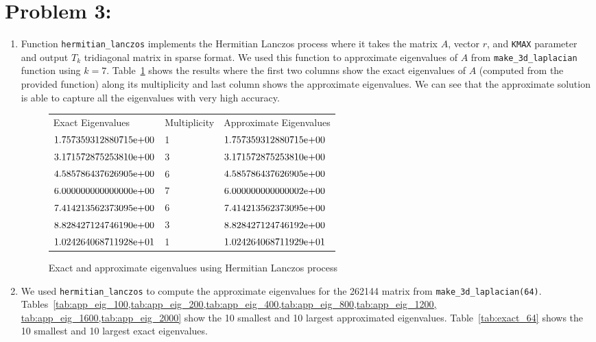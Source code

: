 \newpage
\section*{Problem 3:}
\begin{enumerate}
\item Function \texttt{hermitian\_lanczos} implements the Hermitian Lanczos process where it takes the matrix $A$, vector $r$, and \texttt{KMAX} parameter and output $T_{k}$ tridiagonal matrix in sparse format. We used this function to approximate eigenvalues of $A$ from \texttt{make\_3d\_laplacian} function using $k=7$. Table~\ref{tab:app_eig_7} shows the results where the first two columns show the exact eigenvalues of $A$ (computed from the provided function) along its multiplicity and last column shows the approximate eigenvalues. We can see that the approximate solution is able to capture all the eigenvalues with very high accuracy.

\begin{figure}[tbh]
 \centering    
\begin{tabular}{ |p{5cm}| p{2cm}|| p{5cm}|}
\hline
 Exact Eigenvalues  & Multiplicity & Approximate Eigenvalues \\ \hhline{|=|=|=|}   
${1.757359312880715}\mathrm{e}{+00}$ & 1& ${1.757359312880715}\mathrm{e}{+00}$ \\
${3.171572875253810}\mathrm{e}{+00}$ &3 & ${3.171572875253810}\mathrm{e}{+00}$ \\
${4.585786437626905}\mathrm{e}{+00}$ &6 & ${4.585786437626905}\mathrm{e}{+00}$ \\
${6.000000000000000}\mathrm{e}{+00}$ & 7& ${6.000000000000002}\mathrm{e}{+00}$ \\
${7.414213562373095}\mathrm{e}{+00}$&6 & ${7.414213562373095}\mathrm{e}{+00}$ \\
${8.828427124746190}\mathrm{e}{+00}$ &3 & ${8.828427124746192}\mathrm{e}{+00}$ \\
${1.024264068711928}\mathrm{e}{+01}$ &1 & ${1.024264068711929}\mathrm{e}{+01}$ \\
\hline
\end{tabular} 
\caption{Exact and approximate eigenvalues using Hermitian Lanczos process}
   \label{tab:app_eig_7}
\end{figure}

\item We used \texttt{hermitian\_lanczos} to compute the approximate eigenvalues for the 262144  matrix from \texttt{make\_3d\_laplacian(64)}. Tables~\ref{tab:app_eig_100,tab:app_eig_200,tab:app_eig_400,tab:app_eig_800,tab:app_eig_1200, tab:app_eig_1600,tab:app_eig_2000} show the 10 smallest and 10 largest approximated eigenvalues. Table~\ref{tab:exact_64} shows the 10 smallest and 10 largest exact eigenvalues. 


\end{enumerate}
